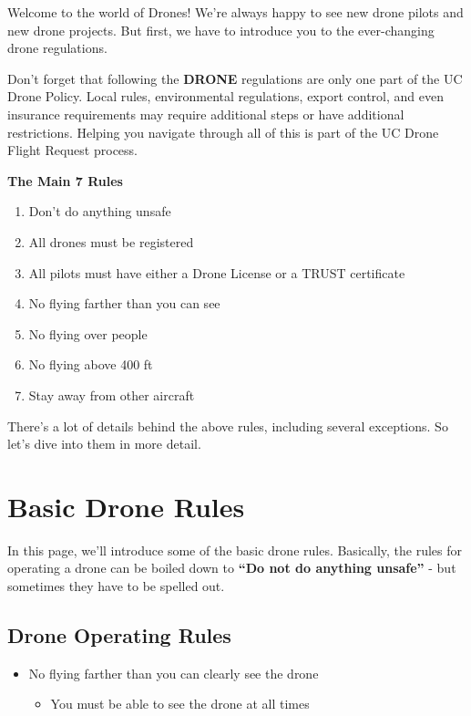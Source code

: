\documentclass[
  12pt,
]{book}
\providecommand{\tightlist}{%
  \setlength{\itemsep}{0pt}\setlength{\parskip}{0pt}}
\newenvironment{notebox}{
  \definecolor{shadecolor}{gray}{.8}  %
  \color{black}
  \begin{shaded}}
 {\end{shaded}}
\begin{document}
Welcome to the world of Drones! We're always happy to see new drone pilots and new drone projects. But first, we have to introduce you to the ever-changing drone regulations.

\begin{notebox}
Don't forget that following the \textbf{DRONE} regulations are only one part of the UC Drone Policy. Local rules, environmental regulations, export control, and even insurance requirements may require additional steps or have additional restrictions. Helping you navigate through all of this is part of the UC Drone Flight Request process.

\end{notebox}

\textbf{The Main 7 Rules}

\begin{enumerate}
\def\labelenumi{\arabic{enumi}.}
\tightlist
\item
  Don't do anything unsafe
\item
  All drones must be registered
\item
  All pilots must have either a Drone License or a TRUST certificate
\item
  No flying farther than you can see
\item
  No flying over people
\item
  No flying above 400 ft
\item
  Stay away from other aircraft
\end{enumerate}

There's a lot of details behind the above rules, including several exceptions. So let's dive into them in more detail.

\section{Basic Drone Rules}\label{basic-drone-rules}

In this page, we'll introduce some of the basic drone rules. Basically, the rules for operating a drone can be boiled down to \textbf{``Do not do anything unsafe''} - but sometimes they have to be spelled out.

\subsection{Drone Operating Rules}\label{drone-operating-rules}

\begin{itemize}
\tightlist
\item
  No flying farther than you can clearly see the drone

  \begin{itemize}
  \tightlist
  \item
    You must be able to see the drone at all times
  \end{itemize}
\end{itemize}
\end{document}
